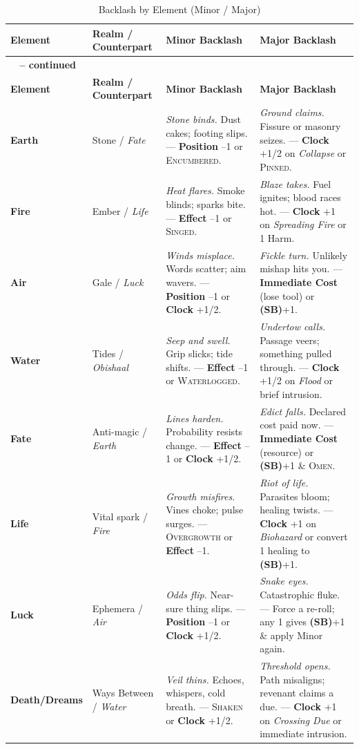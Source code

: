 \begin{longtable}{>{\bfseries}l l >{\raggedright}X >{\raggedright}X}
\caption{Backlash by Element (Minor / Major)}\label{tab:backlash_8x2}\\
\toprule
\textbf{Element} & \textbf{Realm / Counterpart} & \textbf{Minor Backlash} & \textbf{Major Backlash} \\
\midrule
\endfirsthead
\multicolumn{4}{c}%
{{\bfseries \tablename\ \thetable{} -- continued}} \\
\toprule
\textbf{Element} & \textbf{Realm / Counterpart} & \textbf{Minor Backlash} & \textbf{Major Backlash} \\
\midrule
\endhead
\bottomrule
\endfoot
Earth & Stone / \emph{Fate} & \emph{Stone binds.} Dust cakes; footing slips. --- \textbf{Position} --1 or \textsc{Encumbered}. & \emph{Ground claims.} Fissure or masonry seizes. --- \textbf{Clock} +1/2 on \emph{Collapse} or \textsc{Pinned}. \\
Fire & Ember / \emph{Life} & \emph{Heat flares.} Smoke blinds; sparks bite. --- \textbf{Effect} --1 or \textsc{Singed}. & \emph{Blaze takes.} Fuel ignites; blood races hot. --- \textbf{Clock} +1 on \emph{Spreading Fire} or 1 Harm. \\
Air & Gale / \emph{Luck} & \emph{Winds misplace.} Words scatter; aim wavers. --- \textbf{Position} --1 or \textbf{Clock} +1/2. & \emph{Fickle turn.} Unlikely mishap hits you. --- \textbf{Immediate Cost} (lose tool) or \textbf{(SB)}+1. \\
Water & Tides / \emph{Obishaal} & \emph{Seep and swell.} Grip slicks; tide shifts. --- \textbf{Effect} --1 or \textsc{Waterlogged}. & \emph{Undertow calls.} Passage veers; something pulled through. --- \textbf{Clock} +1/2 on \emph{Flood} or brief intrusion. \\
Fate & Anti-magic / \emph{Earth} & \emph{Lines harden.} Probability resists change. --- \textbf{Effect} --1 or \textbf{Clock} +1/2. & \emph{Edict falls.} Declared cost paid now. --- \textbf{Immediate Cost} (resource) or \textbf{(SB)}+1 \& \textsc{Omen}. \\
Life & Vital spark / \emph{Fire} & \emph{Growth misfires.} Vines choke; pulse surges. --- \textsc{Overgrowth} or \textbf{Effect} --1. & \emph{Riot of life.} Parasites bloom; healing twists. --- \textbf{Clock} +1 on \emph{Biohazard} or convert 1 healing to \textbf{(SB)}+1. \\
Luck & Ephemera / \emph{Air} & \emph{Odds flip.} Near-sure thing slips. --- \textbf{Position} --1 or \textbf{Clock} +1/2. & \emph{Snake eyes.} Catastrophic fluke. --- Force a re-roll; any 1 gives \textbf{(SB)}+1 \& apply Minor again. \\
Death/Dreams & Ways Between / \emph{Water} & \emph{Veil thins.} Echoes, whispers, cold breath. --- \textsc{Shaken} or \textbf{Clock} +1/2. & \emph{Threshold opens.} Path misaligns; revenant claims a due. --- \textbf{Clock} +1 on \emph{Crossing Due} or immediate intrusion. \\
\end{longtable}

